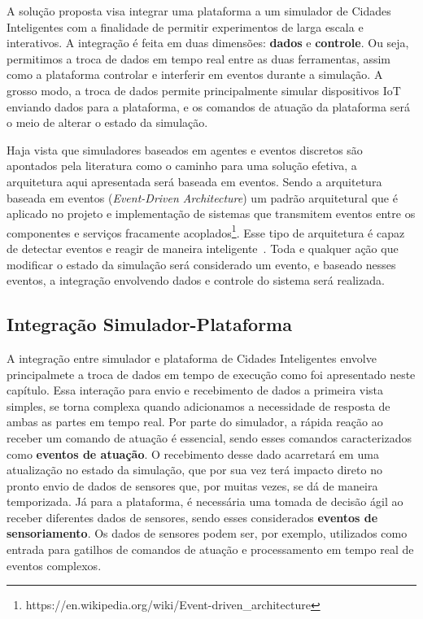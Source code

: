 A solução proposta visa integrar uma plataforma a um simulador de Cidades Inteligentes com a finalidade de permitir experimentos de larga escala e interativos.
A integração é feita em duas dimensões: \textbf{dados} e \textbf{controle}.
Ou seja, permitimos a troca de dados em tempo real entre as duas ferramentas, assim como a plataforma controlar e interferir em eventos durante a simulação.
A grosso modo, a troca de dados permite principalmente simular dispositivos IoT enviando dados para a plataforma, e os comandos de atuação da plataforma será o meio de alterar o estado da simulação.

Haja vista que simuladores baseados em agentes e eventos discretos são apontados pela literatura como o caminho para uma solução efetiva, a arquitetura aqui apresentada será baseada em eventos.
Sendo a arquitetura baseada em eventos (\textit{Event-Driven Architecture}) um padrão arquitetural que é aplicado no projeto e implementação de sistemas que transmitem eventos entre os componentes e
serviços fracamente acoplados\footnote{https://en.wikipedia.org/wiki/Event-driven\_architecture}.
Esse tipo de arquitetura é capaz de detectar eventos e reagir de maneira inteligente~\cite{taylor_2009}.
Toda e qualquer ação que modificar o estado da simulação será considerado um evento, e baseado nesses eventos, a integração envolvendo dados e controle do sistema será realizada.


\subsection{Integração Simulador-Plataforma}

A integração entre simulador e plataforma de Cidades Inteligentes envolve principalmete a troca de dados em tempo de execução como foi apresentado neste capítulo.
Essa interação para envio e recebimento de dados a primeira vista simples, se torna complexa quando adicionamos a necessidade de resposta de ambas as partes em tempo real.
Por parte do simulador, a rápida reação ao receber um comando de atuação é essencial, sendo esses comandos caracterizados como \textbf{eventos de atuação}.
O recebimento desse dado acarretará em uma atualização no estado da simulação, que por sua vez terá impacto direto no pronto envio de dados de sensores que, por muitas vezes,
se dá de maneira temporizada.
Já para a plataforma, é necessária uma tomada de decisão ágil ao receber diferentes dados de sensores, sendo esses considerados \textbf{eventos de sensoriamento}.
Os dados de sensores podem ser, por exemplo, utilizados como entrada para gatilhos de comandos de atuação e processamento em tempo real de eventos complexos.

